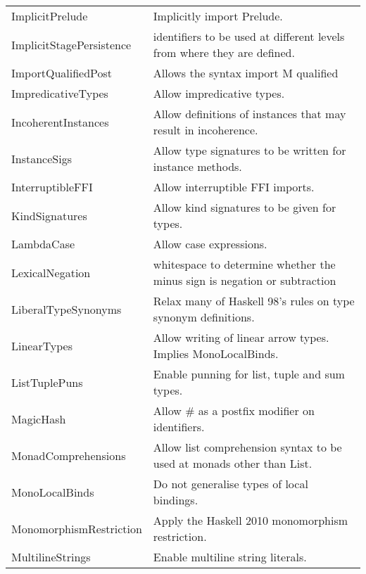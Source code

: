 \documentclass[openany, 12pt]{book}
\begin{document}
\begin{center}
\begin{supertabular}{ll}
		ImplicitPrelude            & Implicitly import Prelude.                                                 \\
		ImplicitStagePersistence   & identifiers to be used at different levels from where they are defined.    \\
		ImportQualifiedPost        & Allows the syntax import M qualified                                       \\
		ImpredicativeTypes         & Allow impredicative types.                                                 \\
		IncoherentInstances        & Allow definitions of instances that may result in incoherence.             \\
		InstanceSigs               & Allow type signatures to be written for instance methods.                  \\
		InterruptibleFFI           & Allow interruptible FFI imports.                                           \\
		KindSignatures             & Allow kind signatures to be given for types.                               \\
		LambdaCase                 & Allow case expressions.                                                    \\
		LexicalNegation            & whitespace to determine whether the minus sign is negation or subtraction  \\
		LiberalTypeSynonyms        & Relax many of Haskell 98's rules on type synonym definitions.              \\
		LinearTypes                & Allow writing of linear arrow types. Implies MonoLocalBinds.               \\
		ListTuplePuns              & Enable punning for list, tuple and sum types.                              \\
		MagicHash                  & Allow \# as a postfix modifier on identifiers.                             \\
		MonadComprehensions        & Allow list comprehension syntax to be used at monads other than List.      \\
		MonoLocalBinds             & Do not generalise types of local bindings.                                 \\
		MonomorphismRestriction    & Apply the Haskell 2010 monomorphism restriction.                           \\
		MultilineStrings           & Enable multiline string literals.                                          \\

\end{supertabular}
\end{center}
\end{document}
